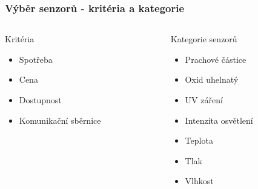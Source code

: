 \documentclass[%
  12pt,       				%
	t,                  %
	aspectratio=1610,   %
	unicode,						%
]{beamer}				    	%
\begin{document}

\begin{frame}
	\frametitle{Výběr senzorů - kritéria a kategorie}
	\begin{columns}[T]
		\begin{column}{0.5\columnwidth}
			Kritéria
			\begin{itemize}
				\item Spotřeba
				\item Cena
				\item Dostupnost
				\item Komunikační sběrnice
			\end{itemize}
		\end{column}

		\begin{column}{0.5\columnwidth}
			Kategorie senzorů
			\begin{itemize}
				\item Prachové částice
				\item Oxid uhelnatý
				\item UV záření
				\item Intenzita osvětlení
				\item Teplota
				\item Tlak
				\item Vlhkost
			\end{itemize}
		\end{column}
	\end{columns}
\end{frame}

\end{document}
